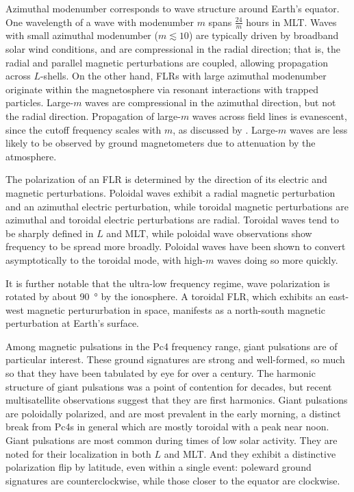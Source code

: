 \documentclass[draft,linenumbers]{agujournal}
\begin{document}
Azimuthal modenumber corresponds to wave structure around Earth's equator. One wavelength of a wave with modenumber $m$ spans $\frac{24}{m}$ hours in MLT. Waves with small azimuthal modenumber ($m \lesssim 10$) are typically driven by broadband solar wind conditions\citep{degeling_2014,hao_2014,zong_2009,chen_1974,liu_2011,southwood_1974}, and are compressional in the radial direction; that is, the radial and parallel magnetic perturbations are coupled, allowing propagation across $L$-shells. On the other hand, FLRs with large azimuthal modenumber originate within the magnetosphere via resonant interactions with trapped particles. Large-$m$ waves are compressional in the azimuthal direction, but not the radial direction. Propagation of large-$m$ waves across field lines is evanescent\citep{cummings_1969,radoski_1974}, since the cutoff frequency scales with $m$, as discussed by \citet{lee_1990}. Large-$m$ waves are less likely to be observed by ground magnetometers due to attenuation by the atmosphere\citep{hughes_1976,wright_1999,yeoman_2001}.

The polarization of an FLR is determined by the direction of its electric and magnetic perturbations. Poloidal waves exhibit a radial magnetic perturbation and an azimuthal electric perturbation, while toroidal magnetic perturbations are azimuthal and toroidal electric perturbations are radial. Toroidal waves tend to be sharply defined in $L$ and MLT, while poloidal wave observations show frequency to be spread more broadly\citep{engebretson_1986}. Poloidal waves have been shown to convert asymptotically to the toroidal mode, with high-$m$ waves doing so more quickly\citep{mann_1995,mann_1997,radoski_1974}.

It is further notable that the ultra-low frequency regime, wave polarization is rotated by about \SI{90}{\degree} by the ionosphere\citep{nishida_1964_screening}. A toroidal FLR, which exhibits an east-west magnetic pertururbation in space, manifests as a north-south magnetic perturbation at Earth's surface.

Among magnetic pulsations in the Pc4 frequency range, giant pulsations are of particular interest. These ground signatures are strong and well-formed, so much so that they have been tabulated by eye for over a century\citep{birkeland_1901}. The harmonic structure of giant pulsations was a point of contention for decades, but recent multisatellite observations suggest that they are first harmonics\citep{glassmeier_1999,hillebrand_1982,kokubun_1989,takahashi_2011}. Giant pulsations are poloidally polarized, and are most prevalent in the early morning\citep{chisham_1991,glassmeier_1980,rostoker_1979}, a distinct break from Pc4s in general which are mostly toroidal with a peak near noon\citep{anderson_1990}. Giant pulsations are most common during times of low solar activity\citep{brekke_1987}. They are noted for their localization in both $L$ and MLT\citep{anderson_1990}. And they exhibit a distinctive polarization flip by latitude, even within a single event: poleward ground signatures are counterclockwise, while those closer to the equator are clockwise\citep{eleman_1967}.
\end{document}
